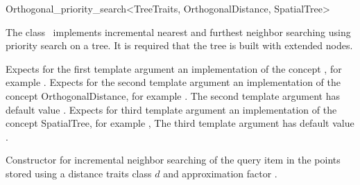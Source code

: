 

\begin{ccRefClass}{Orthogonal_priority_search<TreeTraits, OrthogonalDistance, SpatialTree>}  %


\ccDefinition

The class \ccRefName\ implements incremental nearest and furthest neighbor searching
using priority search on a tree. It is required that the tree is
built with extended nodes.


\ccParameters

Expects for the first template argument an implementation of the concept ,
for example .
Expects for the second template argument an implementation of the
concept OrthogonalDistance, for example .
The second template argument has default value
.
Expects for third template argument an implementation of the concept SpatialTree,
for example ,
The third template argument has default value .

\ccTypes


\ccCreation
{}  %

\def\ccLongParamLayout{\ccTrue}
{Constructor for incremental neighbor searching of the query item 
in the points stored  using a distance
traits class $d$ and approximation factor .}


\end{ccRefClass}
